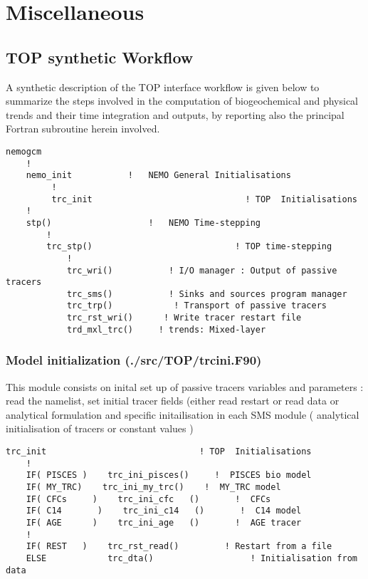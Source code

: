 \documentclass[../main/TOP_manual]{subfiles}
\begin{document}
\chapter{Miscellaneous}

\section{TOP synthetic Workflow}

A synthetic description of the TOP interface workflow is given below to summarize the steps involved in the computation of biogeochemical and physical trends and their time integration and outputs, by reporting also the principal Fortran subroutine herein involved.


\begin{verbatim}
nemogcm
    !                      
    nemo_init           !   NEMO General Initialisations
         !                   
         trc_init                              ! TOP  Initialisations 
    !
    stp()                   !   NEMO Time-stepping
        !
        trc_stp()                            ! TOP time-stepping
            !
            trc_wri()           ! I/O manager : Output of passive tracers 
            trc_sms()           ! Sinks and sources program manager
            trc_trp()            ! Transport of passive tracers
            trc_rst_wri()      ! Write tracer restart file
            trd_mxl_trc()     ! trends: Mixed-layer
\end{verbatim}

\subsection{Model initialization (./src/TOP/trcini.F90)}

This module consists on inital set up of passive tracers variables and parameters  : read the namelist, set initial tracer fields (either read restart or read data or analytical formulation and  specific initailisation in each SMS module  ( analytical initialisation of tracers or constant values )

\begin{verbatim}
trc_init                              ! TOP  Initialisations 
    !    
    IF( PISCES )    trc_ini_pisces()     !  PISCES bio model
    IF( MY_TRC)    trc_ini_my_trc()    !  MY_TRC model
    IF( CFCs     )    trc_ini_cfc   ()       !  CFCs
    IF( C14       )    trc_ini_c14   ()       !  C14 model
    IF( AGE      )    trc_ini_age   ()       !  AGE tracer
    !
    IF( REST   )    trc_rst_read()         ! Restart from a file  
    ELSE            trc_dta()                   ! Initialisation from data
\end{verbatim}
\end{document}
